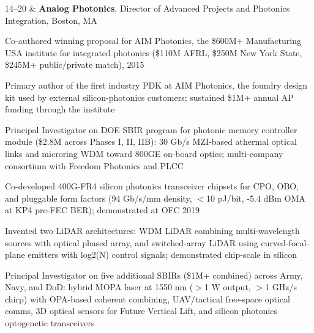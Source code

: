 \vspace{0.3em}

\begin{resumetabular}
14--20 &
\textbf{Analog Photonics}, Director of Advanced Projects and Photonics Integration, Boston, MA
\begin{jobitems}
  \item Co-authored winning proposal for AIM Photonics, the \$600M+ Manufacturing USA institute for integrated photonics (\$110M AFRL, \$250M New York State, \$245M+ public/private match), 2015
  \item Primary author of the first industry PDK at AIM Photonics, the foundry design kit used by external silicon-photonics customers; sustained \$1M+ annual AP funding through the institute
  \item Principal Investigator on DOE SBIR program for photonic memory controller module (\$2.8M across Phases I, II, IIB): 30 Gb/s MZI-based athermal optical links and microring WDM toward 800GE on-board optics; multi-company consortium with Freedom Photonics and PLCC
  \item Co-developed 400G-FR4 silicon photonics transceiver chipsets for CPO, OBO, and pluggable form factors (94 Gb/s/mm density, $<$10 pJ/bit, -5.4 dBm OMA at KP4 pre-FEC BER); demonstrated at OFC 2019
  \item Invented two LiDAR architectures: WDM LiDAR combining multi-wavelength sources with optical phased array, and switched-array LiDAR using curved-focal-plane emitters with log2(N) control signals; demonstrated chip-scale in silicon
  \item Principal Investigator on five additional SBIRs (\$1M+ combined) across Army, Navy, and DoD: hybrid MOPA laser at 1550 nm ($>$1 W output, $>$1 GHz/\textmu s chirp) with OPA-based coherent combining, UAV/tactical free-space optical comms, 3D optical sensors for Future Vertical Lift, and silicon photonics optogenetic transceivers
\end{jobitems}
\end{resumetabular}

\vspace{0.3em}

